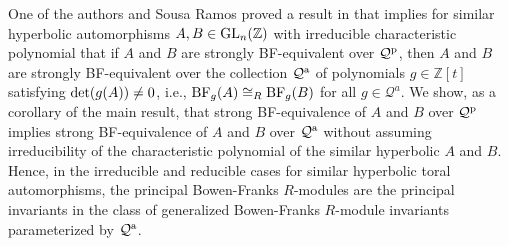 \documentclass{amsart}
\theoremstyle{plain}
\theoremstyle{definition}
\theoremstyle{remark}
\begin{document}
One of the authors and Sousa Ramos proved a result in \cite{MR05} that implies for similar hyperbolic automorphisms $A,B\in {\rm GL}_n({\mathbb Z})$ with irreducible characteristic polynomial that if $A$ and $B$ are strongly {\rm BF}-equivalent over ${\mathcal Q}^{\rm p}$, then $A$ and $B$ are strongly {\rm BF}-equivalent over the collection ${\mathcal Q}^{\rm a}$ of polynomials $g\in {\mathbb Z}[t]$ satisfying ${\rm det}(g(A))\ne 0$, i.e., ${\rm BF}_g(A) \cong_R {\rm BF}_g(B)$ for all $g\in {\mathcal Q}^a$. We show, as a corollary of the main result, that strong {\rm BF}-equivalence of $A$ and $B$ over ${\mathcal Q}^{\rm p}$ implies strong {\rm BF}-equivalence of $A$ and $B$ over ${\mathcal Q}^{\rm a}$ without assuming irreducibility of the characteristic polynomial of the similar hyperbolic $A$ and $B$. Hence, in the irreducible and reducible cases for similar hyperbolic toral automorphisms, the principal Bowen-Franks $R$-modules are the principal invariants in the class of generalized Bowen-Franks $R$-module invariants parameterized by ${\mathcal Q}^{\rm a}$.
\end{document}
